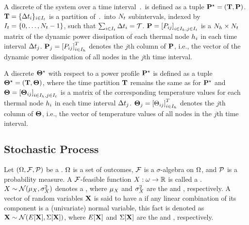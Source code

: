 A discrete  of the system over a time interval $\period$ is defined as a tuple $\mathbf{P}^\star = (\mathbf{T}, \mathbf{P})$. $\mathbf{T} = \{ \Delta t_i \}_{i \in I_t}$ is a partition of $\period$ into $N_t$ subintervals, indexed by $I_t = \{ 0, \dots, N_t - 1 \}$, such that $\sum_{i \in I_t} \Delta t_i = \mathcal{T}$. $\mathbf{P} = \left[P_{ij}\right]_{i \in I_h, j \in I_t}$ is a $N_h \times N_t$ matrix of the dynamic power dissipation of each thermal node $h_i$ in each time interval $\Delta t_j$. $\mathbf{P}_j = \left[P_{ij}\right]^T_{i \in I_h}$ denotes the $j$th column of $\mathbf{P}$, i.e., the vector of the dynamic power dissipation of all nodes in the $j$th time interval.

A discrete  $\mathbf{\Theta}^\star$ with respect to a power profile $\mathbf{P}^\star$ is defined as a tuple $\mathbf{\Theta}^\star = (\mathbf{T}, \mathbf{\Theta})$, where the time partition $\mathbf{T}$ remains the same as for $\mathbf{P}^\star$ and $\mathbf{\Theta} = \left[\mathbf{\Theta}_{ij}\right]_{i \in I_h, j \in I_t}$ is a matrix of the corresponding temperature values for each thermal node $h_i$ in each time interval $\Delta t_j$. $\mathbf{\Theta}_j = \left[\Theta_{ij}\right]^T_{i \in I_h}$ denotes the $j$th column of $\mathbf{\Theta}$, i.e., the vector of temperature values of all nodes in the $j$th time interval.

\subsection{Stochastic Process}
Let $(\Omega, \mathcal{F}, \mathcal{P})$ be a  \cite{oksendal2003}. $\Omega$ is a set of outcomes, $\mathcal{F}$ is a $\sigma$-algebra on $\Omega$, and $\mathcal{P}$ is a probability measure. A $\mathcal{F}$-feasible function $X: \omega \to \mathbb{R}$ is called a . $X \sim \mathcal{N}(\mu_{X}, \sigma_{X}^2)$ denotes a , where $\mu_{X}$ and $\sigma_{X}^2$ are the  and , respectively. A vector of random variables $\mathbf{X}$ is said to have a  if any linear combination of its component is a (univariate) normal variable, this fact is denoted as $\mathbf{X} \sim \mathcal{N}(E[\mathbf{X}], \Sigma[\mathbf{X}])$, where $E[\mathbf{X}]$ and $\Sigma[\mathbf{X}]$ are the  and , respectively.

